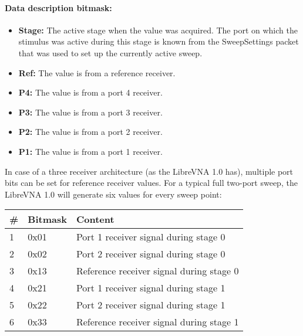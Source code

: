 \documentclass[a4paper,11pt]{article}
\newcommand{\bitrect}[2]{
  \begin{pgfonlayer}{foreground}
    \draw [thick] (0,0) rectangle (#1,1);
    \pgfmathsetmacro\result{#1-1}
    \foreach \x in {1,...,\result}
      \draw [thick] (\x,1) -- (\x, 0.8);
  \end{pgfonlayer}
  \bitlabels{#1}{#2}
}
\newcommand{\rwbits}[3]{
  \draw [thick] (#1,0) rectangle ++(#2,1) node[pos=0.5]{#3};
  \pgfmathsetmacro\start{#1+0.5}
  \pgfmathsetmacro\finish{#1+#2-0.5}
}
\newcommand{\bitlabels}[2]{
  \foreach \bit in {1,...,#1}{
     \pgfmathsetmacro\result{#2}
     \node [above] at (\bit-0.5, 1) {\pgfmathprintnumber{\result}};
   }
}
\begin{document}
\paragraph{Data description bitmask:}
\begin{center}
\end{center}
\begin{itemize}
\item \textbf{Stage:} The active stage when the value was acquired. The port on which the stimulus was active during this stage is known from the SweepSettings packet that was used to set up the currently active sweep.
\item \textbf{Ref:} The value is from a reference receiver.
\item \textbf{P4:} The value is from a port 4 receiver.
\item \textbf{P3:} The value is from a port 3 receiver.
\item \textbf{P2:} The value is from a port 2 receiver.
\item \textbf{P1:} The value is from a port 1 receiver.
\end{itemize}
In case of a three receiver architecture (as the LibreVNA 1.0 has), multiple port bits can be set for reference receiver values. For a typical full two-port sweep, the LibreVNA 1.0 will generate six values for every sweep point:
\begin{ThreePartTable}
\setlength\tabcolsep{3pt}

\begin{longtable}{p{} |  p{}  |  p{}}
\toprule
\textbf{\#} &\textbf{Bitmask} &\textbf{Content} \\ 
\hline
\endhead
\midrule[\heavyrulewidth]
\endfoot  
\midrule[\heavyrulewidth]
\endlastfoot

1 & 0x01 & Port 1 receiver signal during stage 0 \\
2 & 0x02 & Port 2 receiver signal during stage 0 \\
3 & 0x13 & Reference receiver signal during stage 0 \\
4 & 0x21 & Port 1 receiver signal during stage 1 \\
5 & 0x22 & Port 2 receiver signal during stage 1 \\
6 & 0x33 & Reference receiver signal during stage 1 \\
\end{longtable}   
\end{ThreePartTable}
\end{document}
